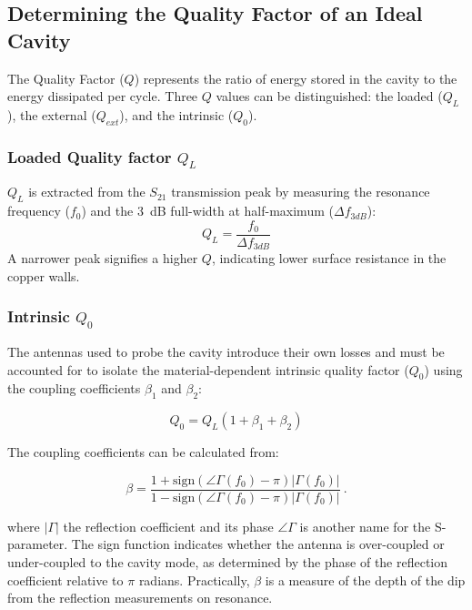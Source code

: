     \subsection{Determining the Quality Factor of an Ideal Cavity}
    
    The Quality Factor ($Q$) represents the ratio of energy stored in the cavity to the energy dissipated per cycle. Three $Q$ values can be distinguished: the loaded ($Q_L$), the external ($Q_{ext}$), and the intrinsic ($Q_0$).
    
    \subsubsection{Loaded Quality factor $Q_L$}
    $Q_L$ is extracted from the $S_{21}$ transmission peak by measuring the resonance frequency ($f_0$) and the 3~dB full-width at half-maximum ($\Delta f_{3dB}$):
    \begin{equation}
        Q_L = \frac{f_0}{\Delta f_{3dB}}
        \label{eq:QVNA_fixed}
    \end{equation}
    \noindent A narrower peak signifies a higher $Q$, indicating lower surface resistance in the copper walls.
    
    \subsubsection{Intrinsic $Q_0$}\label{sec:Qantenna}
    The antennas used to probe the cavity introduce their own losses and must be accounted for to isolate the material-dependent intrinsic quality factor ($Q_0$) using the coupling coefficients $\beta_1$ and $\beta_2$:
    
    \begin{equation}
        Q_0 = Q_L (1 + \beta_1 + \beta_2)
        \label{eq:Q0_calculation}
    \end{equation}
    
    \noindent The coupling coefficients can be calculated from:
    
    \begin{equation}
        \beta = \frac{1 + \text{sign}(\angle\Gamma(f_0) - \pi)|\Gamma(f_0)|}{1 - \text{sign}(\angle\Gamma(f_0) - \pi)|\Gamma(f_0)|}~.
        \label{eq:beta}
    \end{equation}
    
    \noindent where $|\Gamma|$ the reflection coefficient and its phase $\angle\Gamma$ is another name for the S-parameter. The sign function indicates whether the antenna is over-coupled or under-coupled to the cavity mode, as determined by the phase of the reflection coefficient relative to $\pi$ radians. Practically, $\beta$ is a measure of the depth of the dip from the reflection measurements on resonance. 
    

